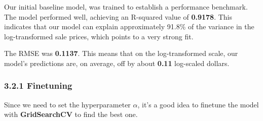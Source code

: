 \documentclass[11pt]{article}
\begin{document}
    Our initial baseline model, was trained to establish a performance
benchmark. The model performed well, achieving an R-squared value of
\textbf{0.9178}. This indicates that our model can explain approximately
91.8\% of the variance in the log-transformed sale prices, which points
to a very strong fit.

The RMSE was \textbf{0.1137}. This means that on the log-transformed
scale, our model's predictions are, on average, off by about
\textbf{0.11} log-scaled dollars.

    \subsubsection{3.2.1 Finetuning}\label{finetuning}

    Since we need to set the hyperparameter \(\alpha\), it's a good idea to
finetune the model with \textbf{GridSearchCV} to find the best one.
\end{document}
